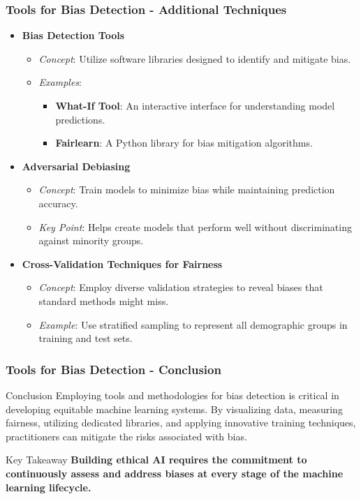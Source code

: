 \documentclass[aspectratio=169]{beamer}
\begin{document}
\begin{frame}[fragile]
    \frametitle{Tools for Bias Detection - Additional Techniques}
    \begin{itemize}
        \item \textbf{Bias Detection Tools}
        \begin{itemize}
            \item \textit{Concept}: Utilize software libraries designed to identify and mitigate bias.
            \item \textit{Examples}:
            \begin{itemize}
                \item \textbf{What-If Tool}: An interactive interface for understanding model predictions.
                \item \textbf{Fairlearn}: A Python library for bias mitigation algorithms.
            \end{itemize}
        \end{itemize}
        
        \item \textbf{Adversarial Debiasing}
        \begin{itemize}
            \item \textit{Concept}: Train models to minimize bias while maintaining prediction accuracy.
            \item \textit{Key Point}: Helps create models that perform well without discriminating against minority groups.
        \end{itemize}
        
        \item \textbf{Cross-Validation Techniques for Fairness}
        \begin{itemize}
            \item \textit{Concept}: Employ diverse validation strategies to reveal biases that standard methods might miss.
            \item \textit{Example}: Use stratified sampling to represent all demographic groups in training and test sets.
        \end{itemize}
    \end{itemize}
\end{frame}

\begin{frame}[fragile]
    \frametitle{Tools for Bias Detection - Conclusion}
    \begin{block}{Conclusion}
        Employing tools and methodologies for bias detection is critical in developing equitable machine learning systems. By visualizing data, measuring fairness, utilizing dedicated libraries, and applying innovative training techniques, practitioners can mitigate the risks associated with bias.
    \end{block}
    \begin{block}{Key Takeaway}
        \textbf{Building ethical AI requires the commitment to continuously assess and address biases at every stage of the machine learning lifecycle.}
    \end{block}
\end{frame}
\end{document}
